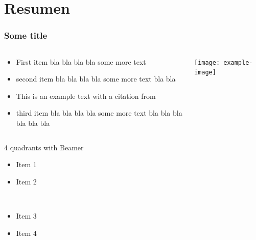 \documentclass[
	11pt, %
]{beamer}
\newcommand\FourQuad[4]{%
  \begin{minipage}[b][.33\textheight][t] 
    {.48\textwidth}#1\end{minipage}\hfill%
    \begin{minipage}[b][.33\textheight][t] 
      {.48\textwidth}#2\end{minipage}\\[0.5em]
      \begin{minipage}[b][.33\textheight][t] 
        {.48\textwidth}#3\end{minipage}\hfill
        \begin{minipage}[b][.33\textheight][t] 
          {.48\textwidth}#4\end{minipage}%
}
\begin{document}


\section{Resumen}

\begin{frame}
  \frametitle{Some title}
  \setlength{\leftmargini}{0.5em}
  \begin{columns}[c, onlytextwidth]%
    \begin{column}{.5\textwidth}%
      \setlength{\partopsep}{0pt}%
      \begin{itemize}
        \itemsep 1.5em
      \item First item bla bla bla bla some more text
      \item second item bla bla bla bla some more text bla bla
      \item This is an example text with a citation from
      \item third item bla bla bla bla some more text bla bla bla bla bla bla
      \end{itemize}
    \end{column}%
    \begin{column}{.45\textwidth}
      \begin{center}
        \texttt{[image: example-image]}
      \end{center}
    \end{column}%
\end{columns}
\end{frame}

\begin{frame}{4 quadrants with Beamer}
  \FourQuad%
   { \begin{itemize}
      \item<1-> Item 1
     \end{itemize}\vspace{2cm}\hspace{2.7cm}
     \makebox[\linewidth]{\resizebox{2.9\linewidth}{1pt}{$\bullet$}}
   }
   { \begin{itemize}
      \item<1-> Item 2
     \end{itemize}\vspace{2cm} 
   }
   { \begin{itemize}
      \item<1-> Item 3
     \end{itemize} 
   }
   { \begin{itemize}
      \item<1-> Item 4
     \end{itemize}\vspace{1.5cm}
     \begin{rotate}{90}\makebox[\linewidth]{\resizebox{2.0\linewidth} 
     {1pt}{$\bullet$}}\end{rotate}
   }

\end{frame}
\end{document}

